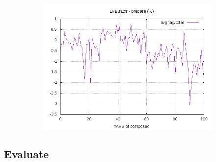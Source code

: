 \documentclass[10pt,a4paper]{article}
\begin{document}
\begin{figure}[h]
\begin{subfigure}[t]{0.3\textwidth}
        \includegraphics[width=\textwidth]{eval_prepare_frac}
        \caption{}
    \end{subfigure}
\end{figure}

\subsection{Evaluate}
\end{document}
